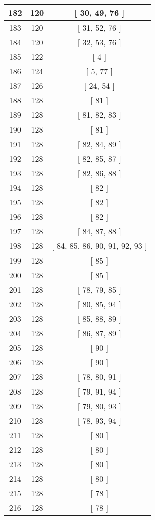 \begin{center}
\begin{longtable}[H]{|| c c c ||}
\hline
182 & 120 & [ 30, 49, 76 ] \\ 
\hline
183 & 120 & [ 31, 52, 76 ] \\ 
\hline
184 & 120 & [ 32, 53, 76 ] \\ 
\hline
185 & 122 & [ 4 ] \\ 
\hline
186 & 124 & [ 5, 77 ] \\ 
\hline
187 & 126 & [ 24, 54 ] \\ 
\hline
188 & 128 & [ 81 ] \\ 
\hline
189 & 128 & [ 81, 82, 83 ] \\ 
\hline
190 & 128 & [ 81 ] \\ 
\hline
191 & 128 & [ 82, 84, 89 ] \\ 
\hline
192 & 128 & [ 82, 85, 87 ] \\ 
\hline
193 & 128 & [ 82, 86, 88 ] \\ 
\hline
194 & 128 & [ 82 ] \\ 
\hline
195 & 128 & [ 82 ] \\ 
\hline
196 & 128 & [ 82 ] \\ 
\hline
197 & 128 & [ 84, 87, 88 ] \\ 
\hline
198 & 128 & [ 84, 85, 86, 90, 91, 92, 93 ] \\ 
\hline
199 & 128 & [ 85 ] \\ 
\hline
200 & 128 & [ 85 ] \\ 
\hline
201 & 128 & [ 78, 79, 85 ] \\ 
\hline
202 & 128 & [ 80, 85, 94 ] \\ 
\hline
203 & 128 & [ 85, 88, 89 ] \\ 
\hline
204 & 128 & [ 86, 87, 89 ] \\ 
\hline
205 & 128 & [ 90 ] \\ 
\hline
206 & 128 & [ 90 ] \\ 
\hline
207 & 128 & [ 78, 80, 91 ] \\ 
\hline
208 & 128 & [ 79, 91, 94 ] \\ 
\hline
209 & 128 & [ 79, 80, 93 ] \\ 
\hline
210 & 128 & [ 78, 93, 94 ] \\ 
\hline
211 & 128 & [ 80 ] \\ 
\hline
212 & 128 & [ 80 ] \\ 
\hline
213 & 128 & [ 80 ] \\ 
\hline
214 & 128 & [ 80 ] \\ 
\hline
215 & 128 & [ 78 ] \\ 
\hline
216 & 128 & [ 78 ] \\ 

\end{longtable}
\end{center}
